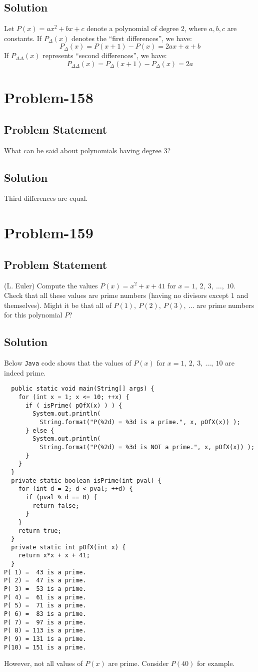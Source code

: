 \documentclass[12pt]{article}
\begin{document}
\subsection*{Solution}
Let $P(x) = ax^2 + bx + c$ denote a polynomial of degree $2$, where $a, b, c$ are constants. If $P_{\Delta}(x)$ denotes the ``first differences'', we have:
\[
	P_{\Delta}(x) = P(x+1)-P(x) = 2ax + a+b
\]
If $P_{\Delta \Delta}(x)$ represents ``second differences'', we have:
\[
	P_{\Delta \Delta}(x) = P_{\Delta}(x+1) - P_{\Delta}(x) = 2a
\]

\section*{Problem-158}
\subsection*{Problem Statement}
What can be said about polynomials having degree $3$?
\subsection*{Solution}
Third differences are equal.

\section*{Problem-159}
\subsection*{Problem Statement}
(L. Euler) Compute the values $P(x) = x^2+x+41$ for $x=1,\ 2,\ 3,\ \ldots,\ 10$. Check that all these values are prime numbers (having no divisors except $1$ and themselves). Might it be that all of $P(1),\ P(2),\ P(3),\ \ldots$ are prime numbers for this polynomial $P$?
\subsection*{Solution}
Below {\tt Java} code shows that the values of $P(x)$ for $x=1,\ 2,\ 3,\ \ldots,\ 10$ are indeed prime.
\begin{verbatim}
  public static void main(String[] args) {
    for (int x = 1; x <= 10; ++x) {
      if ( isPrime( pOfX(x) ) ) {
        System.out.println( 
          String.format("P(%2d) = %3d is a prime.", x, pOfX(x)) );
      } else {
        System.out.println( 
          String.format("P(%2d) = %3d is NOT a prime.", x, pOfX(x)) );
      }
    }
  }
  private static boolean isPrime(int pval) {
    for (int d = 2; d < pval; ++d) {
      if (pval % d == 0) {
        return false;
      }
    }
    return true;
  }
  private static int pOfX(int x) {
    return x*x + x + 41;
  }
P( 1) =  43 is a prime.
P( 2) =  47 is a prime.
P( 3) =  53 is a prime.
P( 4) =  61 is a prime.
P( 5) =  71 is a prime.
P( 6) =  83 is a prime.
P( 7) =  97 is a prime.
P( 8) = 113 is a prime.
P( 9) = 131 is a prime.
P(10) = 151 is a prime.
\end{verbatim}
However, not all values of $P(x)$ are prime. Consider $P(40)$ for example.
\end{document}
